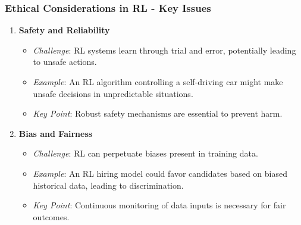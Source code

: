 \documentclass{beamer}
\begin{document}
\begin{frame}[fragile]
    \frametitle{Ethical Considerations in RL - Key Issues}
    \begin{enumerate}
        \item \textbf{Safety and Reliability}
            \begin{itemize}
                \item \textit{Challenge}: RL systems learn through trial and error, potentially leading to unsafe actions.
                \item \textit{Example}: An RL algorithm controlling a self-driving car might make unsafe decisions in unpredictable situations.
                \item \textit{Key Point}: Robust safety mechanisms are essential to prevent harm.
            \end{itemize}
        \item \textbf{Bias and Fairness}
            \begin{itemize}
                \item \textit{Challenge}: RL can perpetuate biases present in training data.
                \item \textit{Example}: An RL hiring model could favor candidates based on biased historical data, leading to discrimination.
                \item \textit{Key Point}: Continuous monitoring of data inputs is necessary for fair outcomes.
            \end{itemize}
    \end{enumerate}
\end{frame}
\end{document}
